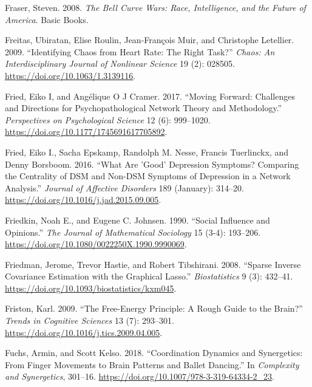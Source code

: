 \documentclass[
  a4paper,
  DIV=11,
  numbers=noendperiod,
  oneside]{scrreprt}
\newlength{\cslhangindent}
\newlength{\cslentryspacingunit} %
\newenvironment{CSLReferences}[2] %
 {%
  \setlength{\parindent}{0pt}
  \ifodd #1
  \let\oldpar\par
  \def\par{\hangindent=\cslhangindent\oldpar}
  \fi
  \setlength{\parskip}{#2\cslentryspacingunit}
 }%
 {}
\begin{document}
\begin{CSLReferences}{1}{0}
\leavevmode{}%
Fraser, Steven. 2008. \emph{The {Bell Curve Wars}: {Race},
{Intelligence}, and the {Future} of {America}}. {Basic Books}.

\leavevmode{}%
Freitas, Ubiratan, Elise Roulin, Jean-François Muir, and Christophe
Letellier. 2009. {``Identifying Chaos from Heart Rate: {The} Right
Task?''} \emph{Chaos: An Interdisciplinary Journal of Nonlinear Science}
19 (2): 028505. \url{https://doi.org/10.1063/1.3139116}.

\leavevmode{}%
Fried, Eiko I, and Angélique O J Cramer. 2017. {``Moving {Forward}:
{Challenges} and {Directions} for {Psychopathological Network Theory}
and {Methodology}.''} \emph{Perspectives on Psychological Science} 12
(6): 999--1020. \url{https://doi.org/10.1177/1745691617705892}.

\leavevmode{}%
Fried, Eiko I., Sacha Epskamp, Randolph M. Nesse, Francis Tuerlinckx,
and Denny Borsboom. 2016. {``What Are 'Good' Depression Symptoms?
{Comparing} the Centrality of {DSM} and Non-{DSM} Symptoms of Depression
in a Network Analysis.''} \emph{Journal of Affective Disorders} 189
(January): 314--20. \url{https://doi.org/10.1016/j.jad.2015.09.005}.

\leavevmode{}%
Friedkin, Noah E., and Eugene C. Johnsen. 1990. {``Social Influence and
Opinions.''} \emph{The Journal of Mathematical Sociology} 15 (3-4):
193--206. \url{https://doi.org/10.1080/0022250X.1990.9990069}.

\leavevmode{}%
Friedman, Jerome, Trevor Hastie, and Robert Tibshirani. 2008. {``Sparse
Inverse Covariance Estimation with the Graphical Lasso.''}
\emph{Biostatistics} 9 (3): 432--41.
\url{https://doi.org/10.1093/biostatistics/kxm045}.

\leavevmode{}%
Friston, Karl. 2009. {``The Free-Energy Principle: A Rough Guide to the
Brain?''} \emph{Trends in Cognitive Sciences} 13 (7): 293--301.
\url{https://doi.org/10.1016/j.tics.2009.04.005}.

\leavevmode{}%
Fuchs, Armin, and Scott Kelso. 2018. {``Coordination {Dynamics} and
{Synergetics}: {From Finger Movements} to {Brain Patterns} and {Ballet
Dancing}.''} In \emph{Complexity and {Synergetics}}, 301--16.
\url{https://doi.org/10.1007/978-3-319-64334-2_23}.


\end{CSLReferences}
\end{document}
